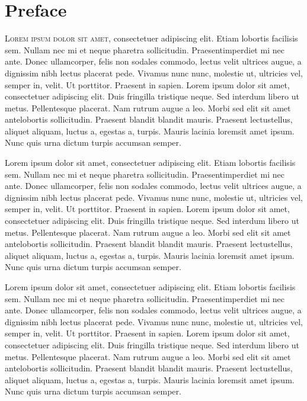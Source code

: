\chapter{Preface}
\lettrine{L}{orem ipsum dolor sit amet}, consectetuer adipiscing elit. Etiam lobortis facilisis sem. Nullam nec mi et neque pharetra sollicitudin. Praesentimperdiet mi nec ante. Donec ullamcorper, felis non sodales commodo, lectus velit ultrices augue, a dignissim nibh lectus placerat pede. Vivamus nunc nunc, molestie ut, ultricies vel, semper in, velit. Ut porttitor. Praesent in sapien. Lorem ipsum dolor sit amet, consectetuer adipiscing elit. Duis fringilla tristique neque. Sed interdum libero ut metus. Pellentesque placerat. Nam rutrum augue a leo. Morbi sed elit sit amet antelobortis sollicitudin. Praesent blandit blandit mauris. Praesent lectustellus, aliquet aliquam, luctus a, egestas a, turpis. Mauris lacinia loremsit amet ipsum. Nunc quis urna dictum turpis accumsan semper.

Lorem ipsum dolor sit amet, consectetuer adipiscing elit. Etiam lobortis facilisis sem. Nullam nec mi et neque pharetra sollicitudin. Praesentimperdiet mi nec ante. Donec ullamcorper, felis non sodales commodo, lectus velit ultrices augue, a dignissim nibh lectus placerat pede. Vivamus nunc nunc, molestie ut, ultricies vel, semper in, velit. Ut porttitor. Praesent in sapien. Lorem ipsum dolor sit amet, consectetuer adipiscing elit. Duis fringilla tristique neque. Sed interdum libero ut metus. Pellentesque placerat. Nam rutrum augue a leo. Morbi sed elit sit amet antelobortis sollicitudin. Praesent blandit blandit mauris. Praesent lectustellus, aliquet aliquam, luctus a, egestas a, turpis. Mauris lacinia loremsit amet ipsum. Nunc quis urna dictum turpis accumsan semper.

Lorem ipsum dolor sit amet, consectetuer adipiscing elit. Etiam lobortis facilisis sem. Nullam nec mi et neque pharetra sollicitudin. Praesentimperdiet mi nec ante. Donec ullamcorper, felis non sodales commodo, lectus velit ultrices augue, a dignissim nibh lectus placerat pede. Vivamus nunc nunc, molestie ut, ultricies vel, semper in, velit. Ut porttitor. Praesent in sapien. Lorem ipsum dolor sit amet, consectetuer adipiscing elit. Duis fringilla tristique neque. Sed interdum libero ut metus. Pellentesque placerat. Nam rutrum augue a leo. Morbi sed elit sit amet antelobortis sollicitudin. Praesent blandit blandit mauris. Praesent lectustellus, aliquet aliquam, luctus a, egestas a, turpis. Mauris lacinia loremsit amet ipsum. Nunc quis urna dictum turpis accumsan semper.

\cleardoublepage   %